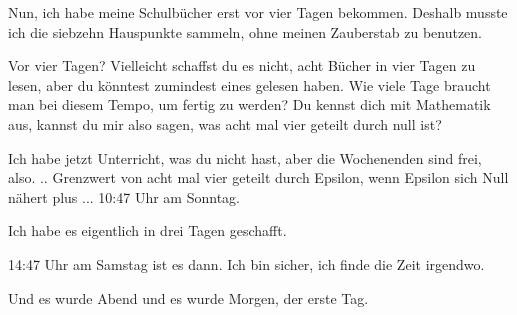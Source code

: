 \glqq{}Nun, ich habe meine Schulbücher erst vor vier Tagen bekommen. Deshalb
musste ich die siebzehn Hauspunkte sammeln, ohne meinen Zauberstab zu
benutzen.\grqq{}

\glqq{}Vor vier Tagen? Vielleicht schaffst du es nicht, acht Bücher in vier Tagen
zu lesen, aber du könntest zumindest eines gelesen haben. Wie viele Tage braucht
man bei diesem Tempo, um fertig zu werden? Du kennst dich mit Mathematik aus,
kannst du mir also sagen, was acht mal vier geteilt durch null ist?\grqq{}

\glqq{}Ich habe jetzt Unterricht, was du nicht hast, aber die Wochenenden sind
frei, also. .. Grenzwert von acht mal vier geteilt durch Epsilon, wenn Epsilon
sich Null nähert plus ... 10:47 Uhr am Sonntag.\grqq{}

\glqq{}Ich habe es eigentlich in drei Tagen geschafft.\grqq{}

\glqq{}14:47 Uhr am Samstag ist es dann. Ich bin sicher, ich finde die Zeit
irgendwo.\grqq{}

Und es wurde Abend und es wurde Morgen, der erste Tag.